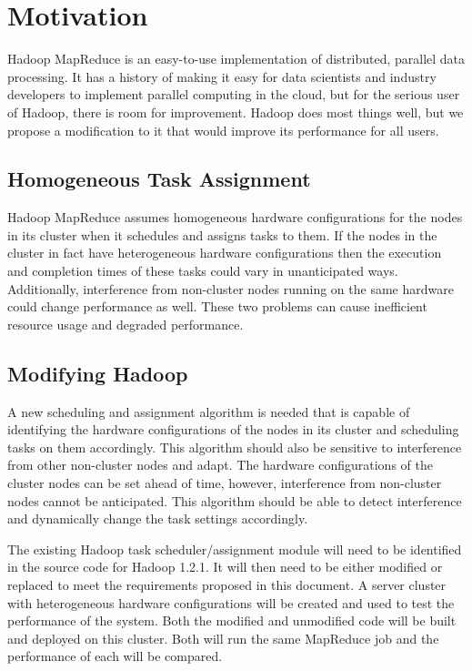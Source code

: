 \section{Motivation}
\label{section:motivation}
Hadoop MapReduce is an easy-to-use implementation of distributed, parallel data 
processing. It has a history of making it easy for data scientists and industry 
developers to implement parallel computing in the cloud, but for the serious 
user of Hadoop, there is room for improvement. Hadoop does most things well, 
but we propose a modification to it that would improve its performance for all 
users.

\subsection{Homogeneous Task Assignment}
Hadoop MapReduce assumes homogeneous hardware configurations for the nodes in 
its cluster when it schedules and assigns tasks to them. If the nodes in the 
cluster in fact have heterogeneous hardware configurations then the execution 
and completion times of these tasks could vary in unanticipated ways. 
Additionally, interference from non-cluster nodes running on the same hardware 
could change performance as well. These two problems can cause inefficient 
resource usage and degraded performance. 

\subsection{Modifying Hadoop}
A new scheduling and assignment algorithm is needed that is capable of 
identifying the hardware configurations of the nodes in its cluster and 
scheduling tasks on them accordingly. This algorithm should also be sensitive 
to interference from other non-cluster nodes and adapt. The hardware 
configurations of the cluster nodes can be set ahead of time, however, 
interference from non-cluster nodes cannot be anticipated. This algorithm 
should be able to detect interference and dynamically change the task settings 
accordingly.

The existing Hadoop task scheduler/assignment module will need to be identified 
in the source code for Hadoop 1.2.1. It will then need to be either modified or 
replaced to meet the requirements proposed in this document. A server cluster 
with heterogeneous hardware configurations will be created and used to test the 
performance of the system. Both the modified and unmodified code will be built 
and deployed on this cluster. Both will run the same MapReduce job and the 
performance of each will be compared.
